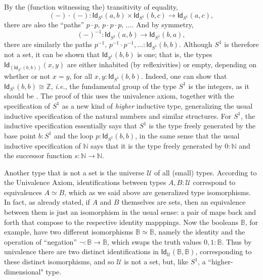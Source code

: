 \documentclass[11pt]{article}
\newcommand{\B}{\ensuremath{\mathbb{B}}}
\newcommand{\N}{\ensuremath{\mathbb{N}}}
\newcommand{\Id}{\mathsf{Id}}
\newcommand{\id}[1]{\Id_{#1}}
\newcommand{\U}{\ensuremath{\mathcal{U}}}
\theoremstyle{remark}
\theoremstyle{definition}
\begin{document}
By the (function witnessing the) transitivity of equality, 
\[
(-)\cdot(-) : \id{S^1}(a,b) \times \id{S^1}(b,c)\to \id{S^1}(a,c),
\]
 there are also the ``paths'' $p\cdot p,\, p\cdot p\cdot p,\, \ldots$.   And by symmetry,
 \[
 (-)^{-1}:\id{S^1}(a,b) \to \id{S^1}(b,a),
 \]
 there are similarly the paths $p^{-1},\, p^{-1}\cdot p^{-1}, \ldots :\id{S^1}(b,b)$.  Although $S^1$ is therefore not a set, it can be shown that $\id{S^1}(b,b)$ is one; that is, the types $\id{\left(\id{S^1}(b,b)\right)}(x,y)$ are either inhabited (by reflexivities) or empty, depending on whether or not $x=y$, for all $x,y : \id{S^1}(b,b)$.  Indeed, one can show that $\id{S^1}(b,b) \cong \mathbb{Z}$, \textit{i.e.}, the fundamental group of the type $S^1$ is the integers, as it should be \cite{LS-Circ}.  
The proof of this uses the univalence axiom, together with the specification of $S^1$ as a new kind of \emph{higher} inductive type, generalizing the usual inductive specification of the natural numbers and similar structures.  For $S^1$, the inductive specification essentially says that $S^1$ is the type freely generated by the base point $b:S^1$ and the loop $p:\id{S^1}(b,b)$, in the same sense that the usual inductive specification of $\N$ says that it is the type freely generated by $0:\N$ and the successor function $s:\N\to\N$.  
  
Another type that is not a set is the universe $\U$ of all (small) types.  According to the Univalence Axiom, identifications between types $A,B:\U$ correspond to equivalences $A\simeq B$, which as we said above are generalized type isomorphisms.  In fact, as already stated, if $A$ and $B$ themselves are sets, then an equivalence between them is just an isomorphism in the usual sense: a pair of maps back and forth that compose to the respective identity mapppings.  Now the booleans $\B$, for example, have two different isomorphisms $\B\simeq \B$, namely the identity and the operation of ``negation'' $\neg:\B\to\B$, which swaps the truth values $0,1:\B$.  Thus by univalence there are two distinct identifications in $\id{\U}(\B,\B)$, corresponding to these distinct isomorphisms, and so $\U$ is not a set, but, like $S^1$, a ``higher-dimensional" type.  
 
\end{document}
